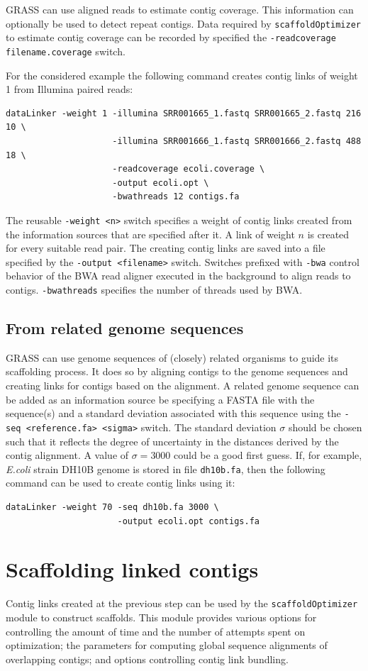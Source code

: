 \documentclass[12pt, a4paper]{report}
\begin{document}
GRASS can use aligned reads to estimate contig coverage. This information can optionally be used to detect repeat contigs. Data required by \verb=scaffoldOptimizer= to estimate contig coverage can be recorded by specified the \verb=-readcoverage filename.coverage= switch.

For the considered example the following command creates contig links of weight 1 from Illumina paired reads:
\begin{verbatim}
dataLinker -weight 1 -illumina SRR001665_1.fastq SRR001665_2.fastq 216 10 \
                     -illumina SRR001666_1.fastq SRR001666_2.fastq 488 18 \
                     -readcoverage ecoli.coverage \
                     -output ecoli.opt \
                     -bwathreads 12 contigs.fa
\end{verbatim}

The reusable \verb=-weight <n>= switch specifies a weight of contig links created from the information sources that are specified after it. A link of weight $n$ is created for every suitable read pair. The creating contig links are saved into a file specified by the \verb=-output <filename>= switch. Switches prefixed with \verb=-bwa= control behavior of the BWA read aligner executed in the background to align reads to contigs. \verb=-bwathreads= specifies the number of threads used by BWA.

\subsection{From related genome sequences}
GRASS can use genome sequences of (closely) related organisms to guide its scaffolding process. It does so by aligning contigs to the genome sequences and creating links for contigs based on the alignment. A related genome sequence can be added as an information source be specifying a FASTA file with the sequence(s) and a standard deviation associated with this sequence using the \verb=-seq <reference.fa> <sigma>= switch.
The standard deviation $\sigma$ should be chosen such that it reflects the degree of uncertainty in the distances derived by the contig alignment. A value of $\sigma=3000$ could be a good first guess.
If, for example, \emph{E.coli} strain DH10B genome is stored in file \verb=dh10b.fa=, then the following command can be used to create contig links using it:
\begin{verbatim}
dataLinker -weight 70 -seq dh10b.fa 3000 \
                      -output ecoli.opt contigs.fa
\end{verbatim}
\section{Scaffolding linked contigs}
Contig links created at the previous step can be used by the \verb=scaffoldOptimizer= module to construct scaffolds. This module provides various options for controlling the amount of time and the number of attempts spent on optimization; the parameters for computing global sequence alignments of overlapping contigs; and options controlling contig link bundling.
\end{document}
